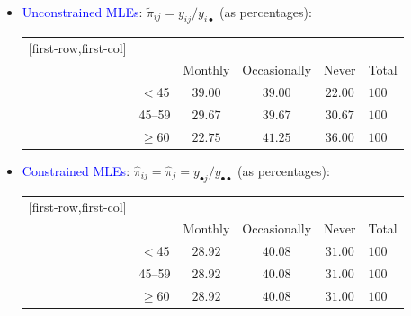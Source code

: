 \documentclass[oneside]{book}\usepackage[]{graphicx}\usepackage[svgnames]{xcolor}
\begin{document}
\begin{itemize}
\begin{table}[H]
            \end{table}
      \item \textcolor{Blue}{Unconstrained MLEs}: $ \tilde{\pi}_{ij}=y_{ij}/y_{i\bullet} $ (as percentages):
            \begin{table}[H]
                  \centering
                  \begin{NiceTabular}{c|ccc|c}[first-row,first-col]
                        &&\\
                        && Monthly & Occasionally & Never & Total\\
                        \midrule
                         & $<$45 & $ 39.00 $ & $ 39.00 $ & $ 22.00 $ & $ 100 $\\
                        & 45--59 & $ 29.67 $ & $ 39.67 $ & $ 30.67 $ & $ 100 $\\
                        & $ \ge $60 & $ 22.75 $ & $ 41.25 $ & $ 36.00 $ & $ 100 $\\
                        \bottomrule
                  \end{NiceTabular}
            \end{table}
      \item \textcolor{Blue}{Constrained MLEs}: $ \hat{\pi}_{ij}=\hat{\pi}_j=y_{\bullet j}/y_{\bullet\bullet} $ (as percentages):
            \begin{table}[H]
                  \centering
                  \begin{NiceTabular}{c|ccc|c}[first-row,first-col]
                        &&\\
                        && Monthly & Occasionally & Never & Total\\
                        \midrule
                         & $<$45 & $ 28.92 $ & $ 40.08 $ & $ 31.00 $ & $ 100 $\\
                        & 45--59 & $ 28.92 $ & $ 40.08 $ & $ 31.00 $ & $ 100 $\\
                        & $ \ge $60 & $ 28.92 $ & $ 40.08 $ & $ 31.00 $ & $ 100 $\\
                        \bottomrule
                  \end{NiceTabular}
            \end{table}
\end{itemize}
\end{document}
